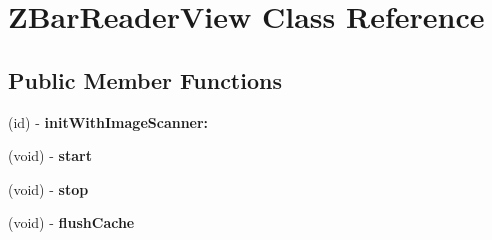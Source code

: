 \hypertarget{interface_z_bar_reader_view}{
\section{ZBarReaderView Class Reference}
\label{interface_z_bar_reader_view}
}
\subsection*{Public Member Functions}
\begin{DoxyCompactItemize}
\item 
\hypertarget{interface_z_bar_reader_view_ad7d1a57429db3ad692026e0ad827d7a6}{
(id) -\/ {\bfseries initWithImageScanner:}}
\label{interface_z_bar_reader_view_ad7d1a57429db3ad692026e0ad827d7a6}

\item 
\hypertarget{interface_z_bar_reader_view_aed3d56253c54f47519b44658a5f424c5}{
(void) -\/ {\bfseries start}}
\label{interface_z_bar_reader_view_aed3d56253c54f47519b44658a5f424c5}

\item 
\hypertarget{interface_z_bar_reader_view_a1691764402605bd68ba19e715fb58372}{
(void) -\/ {\bfseries stop}}
\label{interface_z_bar_reader_view_a1691764402605bd68ba19e715fb58372}

\item 
\hypertarget{interface_z_bar_reader_view_a8f66a608fd39b571443d51cc1c2aa23f}{
(void) -\/ {\bfseries flushCache}}
\label{interface_z_bar_reader_view_a8f66a608fd39b571443d51cc1c2aa23f}

\end{DoxyCompactItemize}
